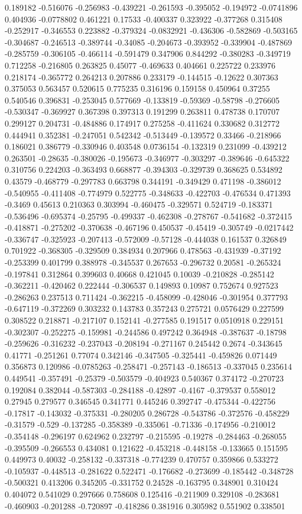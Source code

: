 0.189182 -0.516076 -0.256983 -0.439221 -0.261593 -0.395052 -0.194972 -0.0741896 0.404936 -0.0778802 0.461221 0.17533 -0.400337 0.323922 -0.377268 0.315408 -0.252917 -0.346553 0.223882 -0.379324 -0.0832921 -0.436306 -0.582869 -0.503165 -0.304687 -0.246513 -0.389744 -0.34085 -0.204673 -0.393952 -0.339904 -0.487869 -0.285759 -0.306105 -0.466114 -0.591479 0.347906 0.844292 -0.380283 -0.349719 0.712258 -0.216805 0.263825 0.45077 -0.469633 0.404661 0.225722 0.233976 0.218174 -0.365772 0.264213 0.207886 0.233179 -0.144515 -0.12622 0.307363 0.375053 0.563457 0.520615 0.775235 0.316196 0.159158 0.450964 0.37255 0.540546 0.396831 -0.253045 0.577669 -0.133819 -0.59369 -0.58798 -0.276605 -0.530347 -0.369927 0.367398 0.397313 0.191299 0.263811 0.478738 0.170707 0.299127 0.204731 -0.484886 0.174917 0.275258 -0.411624 0.330682 0.312772 0.444941 0.352381 -0.247051 0.542342 -0.513449 -0.139572 0.33466 -0.218966 0.186021 0.386779 -0.330946 0.403548 0.0736154 -0.132319 0.231099 -0.439212 0.263501 -0.28635 -0.380026 -0.195673 -0.346977 -0.303297 -0.389646 -0.645322 0.310756 0.224203 -0.363493 0.668877 -0.394303 -0.329739 0.368625 0.534892 0.43579 -0.468779 -0.297783 0.663798 0.344191 -0.349429 0.471198 -0.386012 -0.540955 -0.411408 -0.774979 0.522775 -0.348633 -0.422703 -0.476534 0.471393 -0.3469 0.45613 0.210363 0.303994 -0.460475 -0.329571 0.524719 -0.183371 -0.536496 -0.695374 -0.25795 -0.499337 -0.462308 -0.278767 -0.541682 -0.372415 -0.418871 -0.275202 -0.370638 -0.467196 0.450537 -0.45419 -0.305749 -0.0217442 -0.336747 -0.325923 -0.207413 -0.572009 -0.57128 -0.444038 0.161537 0.326849 0.701922 -0.368305 -0.329509 0.384934 0.207966 0.478563 -0.431939 -0.37192 -0.253399 0.401799 0.388978 -0.345537 0.267653 -0.296732 0.20581 -0.265324 -0.197841 0.312864 0.399603 0.40668 0.421045 0.10039 -0.210828 -0.285142 -0.362211 -0.420462 0.222444 -0.306537 0.149893 0.10987 0.752674 0.927523 -0.286263 0.237513 0.711424 -0.362215 -0.458099 -0.428046 -0.301954 0.377793 -0.647119 -0.372269 0.303232 0.143783 0.357243 0.275721 0.0576429 0.227599 0.308522 0.218871 -0.217107 0.152141 -0.277585 0.191517 0.0510918 0.229151 -0.302307 -0.252275 -0.159981 -0.244586 0.497242 0.364948 -0.387637 -0.18798 -0.259626 -0.316232 -0.237043 -0.208194 -0.271167 0.245442 0.2674 -0.343645 0.41771 -0.251261 0.77074 0.342146 -0.347505 -0.325441 -0.459826 0.071449 0.356873 0.120986 -0.0785263 -0.258471 -0.257143 -0.186513 -0.337045 0.235614 0.449541 -0.357491 -0.25379 -0.503579 -0.404923 0.540367 0.374172 -0.270723 0.192084 0.382044 -0.587303 -0.284188 -0.42897 -0.4167 -0.379537 0.558012 0.27945 0.279577 0.346545 0.341771 0.445246 0.392747 -0.475344 -0.422756 -0.17817 -0.143032 -0.375331 -0.280205 0.286728 -0.543786 -0.372576 -0.458229 -0.31579 -0.529 -0.137285 -0.358389 -0.335061 -0.71336 -0.174956 -0.210012 -0.354148 -0.296197 0.624962 0.232797 -0.215595 -0.19278 -0.284463 -0.268055 -0.395509 -0.266553 0.434081 0.121622 -0.453218 -0.448158 -0.133665 0.151595 0.449973 0.40032 -0.258132 -0.337318 -0.774239 0.470757 0.359866 0.533272 -0.105937 -0.448513 -0.281622 0.522471 -0.176682 -0.273699 -0.185442 -0.348728 -0.500321 0.413206 0.345205 -0.331752 0.24528 -0.163795 0.348901 0.310424 0.404072 0.541029 0.297666 0.758608 0.125416 -0.211909 0.329108 -0.283681 -0.460903 -0.201288 -0.720897 -0.418286 0.381916 0.305982 0.551902 0.338501 